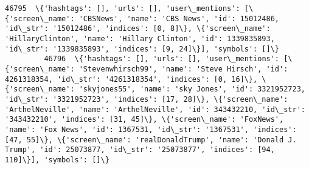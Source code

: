 \documentclass[11pt]{article}
\begin{document}
\begin{Verbatim}[commandchars=\\\{\}]
         46795  \{'hashtags': [], 'urls': [], 'user\_mentions': [\{'screen\_name': 'CBSNews', 'name': 'CBS News', 'id': 15012486, 'id\_str': '15012486', 'indices': [0, 8]\}, \{'screen\_name': 'HillaryClinton', 'name': 'Hillary Clinton', 'id': 1339835893, 'id\_str': '1339835893', 'indices': [9, 24]\}], 'symbols': []\}                                                                                                                                                                                                                                                                                                                                                                                                                                                                                                                                                                                                                                                                                                                                                                                                                                                                                                            
         46796  \{'hashtags': [], 'urls': [], 'user\_mentions': [\{'screen\_name': 'Stevenwhirsch99', 'name': 'Steve Hirsch', 'id': 4261318354, 'id\_str': '4261318354', 'indices': [0, 16]\}, \{'screen\_name': 'skyjones55', 'name': 'sky Jones', 'id': 3321952723, 'id\_str': '3321952723', 'indices': [17, 28]\}, \{'screen\_name': 'ArthelNeville', 'name': 'ArthelNeville', 'id': 343432210, 'id\_str': '343432210', 'indices': [31, 45]\}, \{'screen\_name': 'FoxNews', 'name': 'Fox News', 'id': 1367531, 'id\_str': '1367531', 'indices': [47, 55]\}, \{'screen\_name': 'realDonaldTrump', 'name': 'Donald J. Trump', 'id': 25073877, 'id\_str': '25073877', 'indices': [94, 110]\}], 'symbols': []\}                                                                                                                                                                                                                                                                                                                                                                                                                                                                                                                                        

\end{Verbatim}
\end{document}
